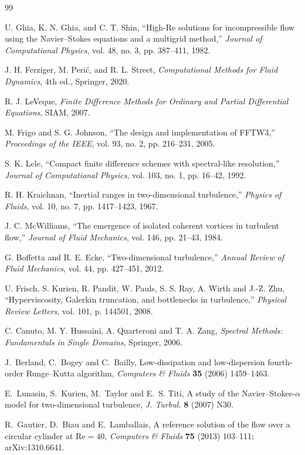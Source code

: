 \documentclass[11pt,a4paper]{article}
\begin{document}
\begin{thebibliography}{99}

U. Ghia, K. N. Ghia, and C. T. Shin,
``High-Re solutions for incompressible flow using the Navier--Stokes equations and a multigrid method,''
\emph{Journal of Computational Physics}, vol. 48, no. 3, pp. 387--411, 1982.

J. H. Ferziger, M. Peri\'{c}, and R. L. Street,
\emph{Computational Methods for Fluid Dynamics}, 4th ed., Springer, 2020.

R. J. LeVeque,
\emph{Finite Difference Methods for Ordinary and Partial Differential Equations},
SIAM, 2007.

M. Frigo and S. G. Johnson,
``The design and implementation of FFTW3,''
\emph{Proceedings of the IEEE}, vol. 93, no. 2, pp. 216--231, 2005.

S. K. Lele,
``Compact finite difference schemes with spectral-like resolution,''
\emph{Journal of Computational Physics}, vol. 103, no. 1, pp. 16--42, 1992.

R. H. Kraichnan,
``Inertial ranges in two-dimensional turbulence,''
\emph{Physics of Fluids}, vol. 10, no. 7, pp. 1417--1423, 1967.

J. C. McWilliams,
``The emergence of isolated coherent vortices in turbulent flow,''
\emph{Journal of Fluid Mechanics}, vol. 146, pp. 21--43, 1984.

G. Boffetta and R. E. Ecke,
``Two-dimensional turbulence,''
\emph{Annual Review of Fluid Mechanics}, vol. 44, pp. 427--451, 2012.

U. Frisch, S. Kurien, R. Pandit, W. Pauls, S. S. Ray, A. Wirth and J.-Z. Zhu,
``Hyperviscosity, Galerkin truncation, and bottlenecks in turbulence,''
\emph{Physical Review Letters}, vol. 101, p. 144501, 2008.

C. Canuto, M. Y. Hussaini, A. Quarteroni and T. A. Zang,
\emph{Spectral Methods: Fundamentals in Single Domains}, Springer, 2006.

J.~Berland, C.~Bogey and C.~Bailly, Low-dissipation and low-dispersion fourth-order Runge--Kutta algorithm, \emph{Computers \& Fluids} \textbf{35} (2006) 1459--1463.

E.~Lunasin, S.~Kurien, M.~Taylor and E.~S. Titi, A study of the Navier--Stokes-$\alpha$ model for two-dimensional turbulence, \emph{J. Turbul.} \textbf{8} (2007) N30.

R.~Gautier, D.~Biau and E.~Lamballais, A reference solution of the flow over a circular cylinder at $\mathrm{Re}=40$, \emph{Computers \& Fluids} \textbf{75} (2013) 103--111; arXiv:1310.6641.

\end{thebibliography}
\end{document}
